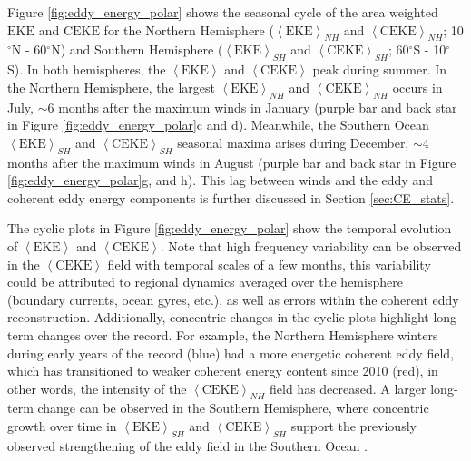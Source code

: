 \documentclass[draft,linenumbers]{agujournal2019}
\newcommand{\EKE}{\textrm{EKE}}
\newcommand{\CEKE}{\textrm{CEKE}}
\begin{document}

	Figure \ref{fig:eddy_energy_polar} shows the seasonal cycle of the area weighted $\EKE$ and $\CEKE$ for the Northern Hemisphere ($\left< \EKE\right>_{NH}$ and $\left< \CEKE\right>_{NH}$; 10$^\circ$N - 60$^\circ$N) and Southern Hemisphere ($\left< \EKE\right>_{SH}$  and $\left< \CEKE\right>_{SH}$; 60$^\circ$S - 10$^\circ$S). 
	In both hemispheres, the $\left<\EKE\right>$ and $\left<\CEKE\right>$ peak during summer. In the Northern Hemisphere, the largest $\left<\EKE\right>_{NH}$ and $\left<\CEKE\right>_{NH}$ occurs in July, $\sim$6 months after the maximum winds in January (purple bar and back star in Figure \ref{fig:eddy_energy_polar}c and d). Meanwhile, the Southern Ocean 
	$\left<\EKE\right>_{SH}$ and $\left<\CEKE\right>_{SH}$ seasonal maxima arises during December, $\sim$4 months after the maximum winds in August (purple bar and back star in Figure \ref{fig:eddy_energy_polar}g, and h). This lag between winds and the eddy and coherent eddy energy components is further discussed in Section \ref{sec:CE_stats}.

	The cyclic plots in Figure \ref{fig:eddy_energy_polar} show the temporal evolution of $\left<\EKE\right>$ and $\left<\CEKE\right>$. 
	Note that high frequency variability can be observed in the $\left<\CEKE\right>$ field with temporal scales of a few months, this variability could be attributed to regional dynamics averaged over the hemisphere (boundary currents, ocean gyres, etc.), as well as errors within the coherent eddy reconstruction. 
	Additionally, concentric changes in the cyclic plots highlight long-term changes over the record. For example, the Northern Hemisphere winters during early years of the record (blue) had a more energetic coherent eddy field, which has transitioned to weaker coherent energy content since 2010 (red), in other words, the intensity of the $\left<\CEKE\right>_{NH}$ field has decreased. A larger long-term change can be observed in the Southern Hemisphere, where concentric growth over time in $\left<\EKE\right>_{SH}$ and $\left<\CEKE\right>_{SH}$ support the previously observed strengthening of the eddy field in the Southern Ocean \citep{Hogg_Recent_2015,Martinez_TKE_2019,Martinez_Kinetic_2021}. 
\end{document}
